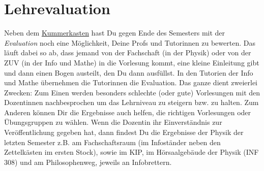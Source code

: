 \section{Lehrevaluation}
\label{eval}

\noindent Neben dem \hyperref[kummerkasten]{Kummerkasten} hast Du gegen Ende des Semesters mit der \emph{Evaluation} noch eine Möglichkeit, Deine Profs und Tutorinnen zu bewerten. Das läuft dabei so ab, dass jemand von der Fachschaft (in der Physik) oder von der ZUV (in der Info und Mathe) in die Vorlesung kommt, eine kleine Einleitung gibt und dann einen Bogen austeilt, den Du dann ausfüllst. In den Tutorien der Info und Mathe übernehmen die Tutorinnen die Evaluation. Das ganze dient zweierlei Zwecken: Zum Einen werden besonders schlechte (oder gute) Vorlesungen mit den Dozentinnen nachbesprochen um das Lehrniveau zu steigern bzw. zu halten. Zum Anderen können Dir die Ergebnisse auch helfen, die richtigen Vorlesungen oder Übungsgruppen zu wählen. Wenn die Dozentin ihr Einverständnis zur Veröffentlichung gegeben hat, dann findest Du die Ergebnisse der Physik der letzten Semester z.B. am Fachschaftsraum (im Infoständer neben den Zettelkästen im ersten Stock), sowie im \gls{KIP}, im Hörsaalgebäude der Physik (\Gls{INF} 308) und am Philosophenweg, jeweils an Infobrettern.
